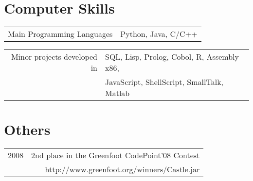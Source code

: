 \documentclass[a4paper,10pt]{article}
\begin{document}

\section{Computer Skills}


\begin{tabularx}{\textwidth}{D|S}
Main Programming Languages  & Python, Java, C/C++\\
\end{tabularx}

\begin{tabularx}{\textwidth}{D|S}
Minor projects developed in & SQL, Lisp, Prolog, Cobol, R, Assembly x86,\\
                            & JavaScript, ShellScript, SmallTalk, Matlab\\
\end{tabularx}


\section{Others}

\begin{tabularx}{\textwidth}{D|R}
2008    & 2nd place in the Greenfoot CodePoint'08 Contest\\
        &\footnotesize \url{http://www.greenfoot.org/winners/Castle.jar}\\
\end{tabularx}
\end{document}
